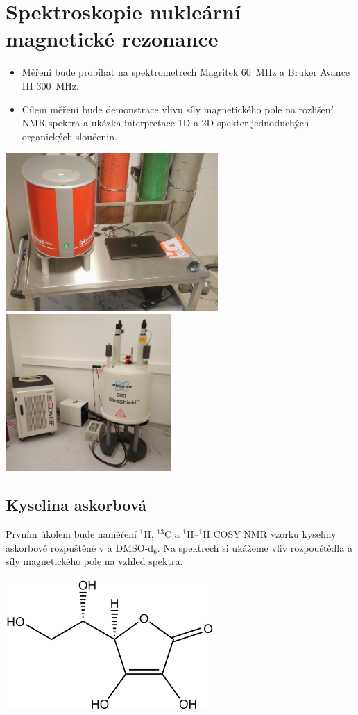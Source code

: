 \documentclass[12pt]{article}
\begin{document}
\section{Spektroskopie nukleární magnetické rezonance}
	\begin{itemize}
	\item Měření bude probíhat na spektrometrech Magritek 60~MHz a Bruker Avance III 300~MHz.
	\item Cílem měření bude demonstrace vlivu síly magnetického pole na rozlišení NMR spektra a ukázka interpretace 1D a 2D spekter jednoduchých organických sloučenin.
	\end{itemize}
	\begin{center}
		\includegraphics[keepaspectratio,height=6cm]{img/Magritek.jpg}
		\includegraphics[keepaspectratio,height=6cm]{img/NMR300-1S12.jpg}
	\end{center}

\subsection{Kyselina askorbová}

Prvním úkolem bude naměření $^1$H, $^{13}$C a $^1$H--$^1$H COSY NMR vzorku kyseliny askorbové rozpuštěné v  a DMSO-d$_6$. Na spektrech si ukážeme vliv rozpouštědla a síly magnetického pole na vzhled spektra.
	\begin{center}
	\includegraphics[keepaspectratio,height=5cm]{img/kys-askorbova.png}
\end{center}
\newpage
\end{document}
